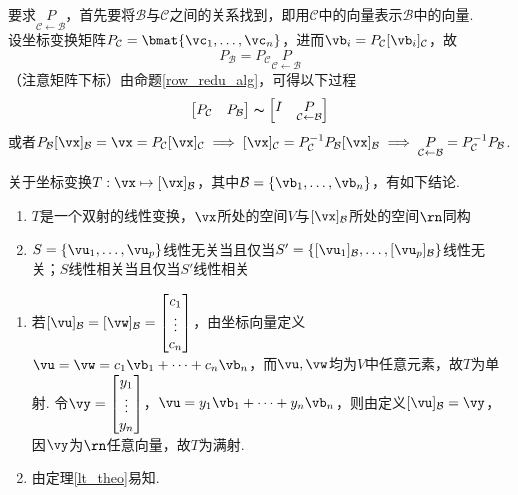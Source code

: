 \begin{myalgorithm}[在$\rn$中换基]
要求$\underset{\mathcal{C}\gets \mathcal{B}}{P}$，首先要将$\mathcal{B}$与$\mathcal{C}$之间的关系找到，即用$\mathcal{C}$中的向量表示$\mathcal{B}$中的向量.\\
设坐标变换矩阵$P_\mathcal{C}=\bmat{\vc_1,\ldots,\vc_n}$，进而$\vb_i=P_{\mathcal{C}}[\vb_i]_{\mathcal{C}}$，故
\[P_{\mathcal{B}}=P_{\mathcal{C}}\underset{\mathcal{C}\gets \mathcal{B}}{P}\]
（注意矩阵下标）由命题\ref{row_redu_alg}，可得以下过程
\[\begin{bmatrix}P_\mathcal{C}&P_\mathcal{B}\end{bmatrix}\thicksim\begin{bmatrix}I&\underset{\mathcal{C}\gets \mathcal{B}}{P}\end{bmatrix}\]
或者$P_\mathcal{B}[\vx]_\mathcal{B}=\vx=P_\mathcal{C}[\vx]_\mathcal{C}\implies [\vx]_\mathcal{C}=P_\mathcal{C}^{-1}P_\mathcal{B}[\vx]_\mathcal{B}\implies \underset{\mathcal{C}\gets \mathcal{B}}{P}=P_{\mathcal{C}}^{-1}P_{\mathcal{B}}$.
\end{myalgorithm}
\begin{theorem}%
关于坐标变换$T:\vx\mapsto[\vx]_{\mathcal{B}}$，其中$\mathcal{B}=\{\vb_1,\dots,\vb_n\}$，有如下结论.
\begin{enumerate}
	\item $T$是一个双射的线性变换，$\vx$所处的空间$V$与$[\vx]_\mathcal{B}$所处的空间$\rn$同构
	\item $S=\{\vu_1,\dots,\vu_p\}$线性无关当且仅当$S'=\left\{[\vu_1]_\mathcal{B},\dots,[\vu_p]_\mathcal{B}\right\}$线性无关；$S$线性相关当且仅当$S'$线性相关
\end{enumerate}
\end{theorem}
\begin{analysis}
\begin{enumerate}
	\item 若$[\vu]_\mathcal{B}=[\vw]_\mathcal{B}=\begin{bmatrix}c_1\\\vdots\\c_n\end{bmatrix}$，由坐标向量定义$\vu=\vw=c_1\vb_1+\cdots+c_n\vb_n$，而$\vu,\vw$均为$V$中任意元素，故$T$为单射. 令$\vy=\begin{bmatrix}y_1\\\vdots\\y_n\end{bmatrix}$，$\vu=y_1\vb_1+\cdots+y_n\vb_n$，则由定义$[\vu]_\mathcal{B}=\vy$，因$\vy$为$\rn$任意向量，故$T$为满射.
	\item 由定理\ref{lt_theo}易知.
\end{enumerate}
\end{analysis}